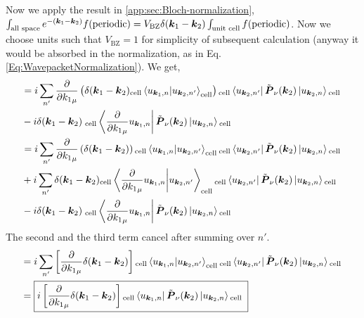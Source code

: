 \documentclass{report}
\renewcommand\vec[1]{\ensuremath\boldsymbol{#1}} %
\begin{document}
Now we apply the result in \ref{app:sec:Bloch-normalization}, $\int_{\text{all space}} e^{-(\vec{k}_1-\vec{k}_2)} f(\text{periodic}) = V_{\text{BZ}} \delta(\vec{k}_1 - \vec{k}_2) \int_{\text{unit cell}} f(\text{periodic})$. Now we choose units such that $V_{\text{BZ}} = 1$ for simplicity of subsequent calculation (anyway it would be absorbed in the normalization, as in Eq. \eqref{Eq:WavepacketNormalization}). We get,
$$
\begin{aligned}
	& = i \sum_{n'} \frac{\partial}{\partial {k_1}_\mu}\left(\delta(\vec{k}_1 - \vec{k}_2){}_{\text{cell}}\bra{ u_{\vec{k}_1,n}} \ket{u_{\vec{k}_2,n'}}_{\text{cell}}\right) {}_{\text{cell}} \bra{u_{\vec{k}_2,n'}} \tilde{\vec{P}}_\nu (\vec{k}_2) \ket{u_{\vec{k}_2,n}}{}_{\text{cell }} \\
	& - i \delta(\vec{k}_1 - \vec{k}_2) {}_{\text{  cell}}\bra{\frac{\partial}{\partial {k_1}_\mu}u_{\vec{k}_1,n}} \tilde{\vec{P}}_\nu (\vec{k}_2) \ket{u_{\vec{k}_2,n}}{}_{\text{cell}} \\
	& = i \sum_{n'} \frac{\partial}{\partial {k_1}_\mu}\left(\delta(\vec{k}_1 - \vec{k}_2)\right){}_{\text{cell}}\bra{ u_{\vec{k}_1,n}} \ket{u_{\vec{k}_2,n'}}_{\text{cell}} {}_{\text{cell}} \bra{u_{\vec{k}_2,n'}} \tilde{\vec{P}}_\nu (\vec{k}_2) \ket{u_{\vec{k}_2,n}}{}_{\text{cell }} \\
	&+ i \sum_{n'} \delta(\vec{k}_1 - \vec{k}_2) {}_{\text{cell}}\bra{\frac{\partial}{\partial {k_1}_\mu} u_{\vec{k}_1,n}} \ket{u_{\vec{k}_2,n'}}_{\text{cell}} {}_{\text{cell}} \bra{u_{\vec{k}_2,n'}} \tilde{\vec{P}}_\nu (\vec{k}_2) \ket{u_{\vec{k}_2,n}}{}_{\text{cell }} \\
	& - i \delta(\vec{k}_1 - \vec{k}_2) {}_{\text{  cell}}\bra{\frac{\partial}{\partial {k_1}_\mu}u_{\vec{k}_1,n}} \tilde{\vec{P}}_\nu (\vec{k}_2) \ket{u_{\vec{k}_2,n}}{}_{\text{cell}} \\
\end{aligned}
$$
The second and the third term cancel after summing over $n'$.
$$
\begin{aligned}
	& =  i \sum_{n'} \left[\frac{\partial}{\partial {k_1}_\mu}\delta(\vec{k}_1 - \vec{k}_2)\right]{}_{\text{cell}}\bra{ u_{\vec{k}_1,n}} \ket{u_{\vec{k}_2,n'}}_{\text{cell}} {}_{\text{cell}} \bra{u_{\vec{k}_2,n'}} \tilde{\vec{P}}_\nu (\vec{k}_2) \ket{u_{\vec{k}_2,n}}{}_{\text{cell }} \\
	& = \boxed{ i \left[\frac{\partial}{\partial {k_1}_\mu}\delta(\vec{k}_1 - \vec{k}_2)\right]{}_{\text{cell}}\bra{ u_{\vec{k}_1,n}} \tilde{\vec{P}}_\nu (\vec{k}_2) \ket{u_{\vec{k}_2,n}}{}_{\text{cell }} }
\end{aligned}
$$
\end{document}
